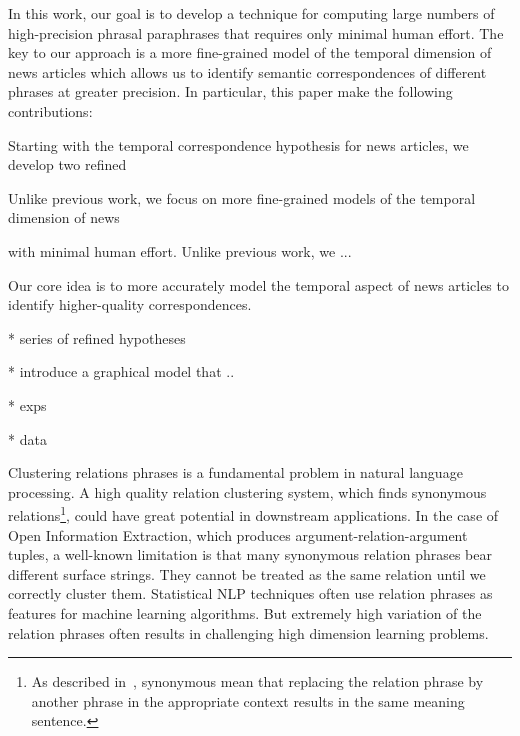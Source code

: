In this work, our goal is to develop a technique for computing large numbers of high-precision phrasal paraphrases that requires only minimal human effort. The key to our approach is a more fine-grained model of the temporal dimension of news articles which allows us to identify semantic correspondences of different phrases at greater precision.
In particular, this paper make the following contributions:

Starting with the temporal correspondence hypothesis for news articles, we develop two refined


Unlike previous work, we focus on more fine-grained
models of the temporal dimension of news 

with minimal human effort. Unlike previous work, we ...

Our core idea is to more accurately model the temporal aspect of news articles to
identify higher-quality correspondences.


* series of refined hypotheses

*  introduce a graphical model that ..

* exps

* data






Clustering relations phrases is a fundamental problem in natural language processing. A high quality relation clustering system, which finds synonymous relations\footnote{As described in~\cite{bhagat2013paraphrase}, synonymous mean that replacing the relation phrase by another phrase in the appropriate context results in the same meaning sentence.}, could have great potential in downstream applications. In the case of Open Information Extraction, which produces argument-relation-argument tuples, a well-known limitation is that many synonymous relation phrases bear different surface strings. They cannot be treated as the same relation until we correctly cluster them. Statistical NLP techniques often use relation phrases as features for machine learning algorithms. But extremely high variation of the relation phrases often results in challenging high dimension learning problems.

